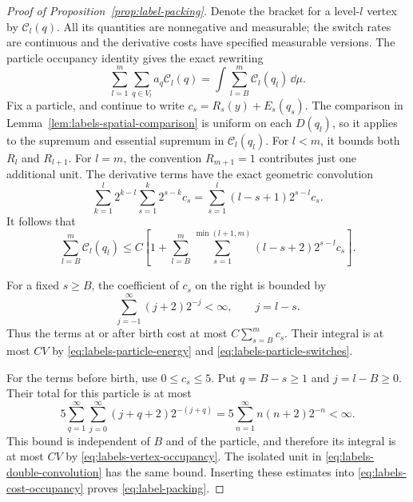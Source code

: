 \begin{proof}[Proof of Proposition~\ref{prop:label-packing}]
Denote the bracket for a level-$l$ vertex by $\mathcal C_l(q)$.
All its quantities are nonnegative and measurable; the switch rates are
continuous and the derivative costs have specified measurable versions.
The particle occupancy identity gives the exact rewriting
\begin{equation}
 \sum_{l=1}^m\sum_{q\in V_l}a_q\mathcal C_l(q)
 =\int\sum_{l=B}^m\mathcal C_l(q_l)\,\dd\mu.
 \label{eq:labels-cost-occupancy}
\end{equation}
Fix a particle, and continue to write $c_s=R_s(y)+E_s(q_s)$.
The comparison in Lemma~\ref{lem:labels-spatial-comparison} is uniform on
each $D(q_l)$, so it applies to the supremum and essential supremum in
$\mathcal C_l(q_l)$. For $l<m$, it bounds both $R_l$ and $R_{l+1}$.
For $l=m$, the convention $R_{m+1}=1$ contributes just one additional
unit. The derivative terms have the exact geometric convolution
\[
 \sum_{k=1}^l2^{k-l}\sum_{s=1}^k2^{s-k}c_s
 =\sum_{s=1}^l(l-s+1)2^{s-l}c_s.
\]
It follows that
\begin{equation}
 \sum_{l=B}^m\mathcal C_l(q_l)
 \le C\left[
  1+\sum_{l=B}^m
     \sum_{s=1}^{\min(l+1,m)}(l-s+2)2^{s-l}c_s
 \right].
 \label{eq:labels-double-convolution}
\end{equation}

For a fixed $s\ge B$, the coefficient of $c_s$ on the right is bounded by
\[
 \sum_{j=-1}^{\infty}(j+2)2^{-j}<\infty,
 \qquad j=l-s.
\]
Thus the terms at or after birth cost at most
$C\sum_{s=B}^m c_s$. Their integral is at most $C V$ by
\eqref{eq:labels-particle-energy} and
\eqref{eq:labels-particle-switches}.

For the terms before birth, use $0\le c_s\le5$. Put $q=B-s\ge1$ and
$j=l-B\ge0$. Their total for this particle is at most
\[
 5\sum_{q=1}^{\infty}\sum_{j=0}^{\infty}
           (j+q+2)2^{-(j+q)}
 =5\sum_{n=1}^{\infty}n(n+2)2^{-n}<\infty.
\]
This bound is independent of $B$ and of the particle, and therefore its
integral is at most $C V$ by \eqref{eq:labels-vertex-occupancy}.
The isolated unit in \eqref{eq:labels-double-convolution} has the same
bound. Inserting these estimates into \eqref{eq:labels-cost-occupancy}
proves \eqref{eq:label-packing}.
\end{proof}
